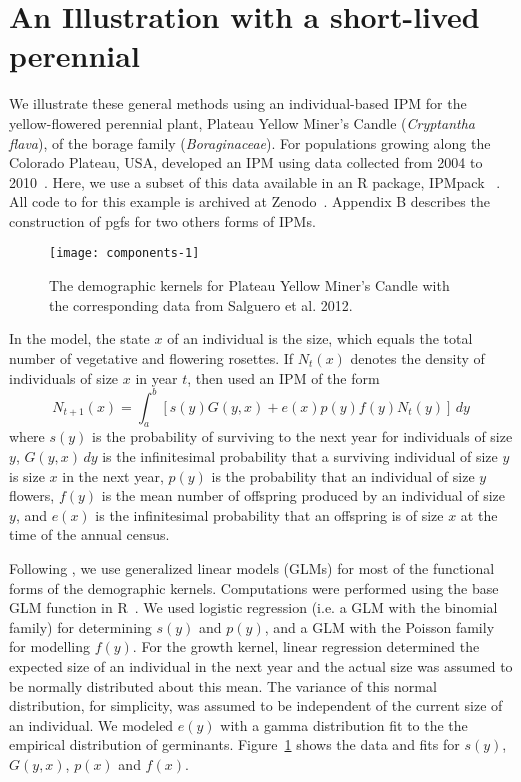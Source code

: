 \documentclass[12pt]{amsart}\usepackage[]{graphicx}\usepackage[]{color}
\makeatletter
\def\maxwidth{ %
  \ifdim\Gin@nat@width>\linewidth
    \linewidth
  \else
    \Gin@nat@width
  \fi
}
\newenvironment{knitrout}{}{} %
\makeatother
\begin{document}
\section*{An Illustration with a short-lived perennial}

We illustrate these general methods using an individual-based IPM for the yellow-flowered perennial plant, Plateau Yellow Miner's Candle (\emph{Cryptantha flava}), of the borage family (\emph{Boraginaceae}). For populations growing along the Colorado Plateau, USA, \citet{salguero-etal-12} developed an IPM using data collected from 2004 to 2010~\citep{salguero-gomez-etal-14}. Here, we use a subset of this data available in an R package, IPMpack ~\citep{IPMpack}.  All code to for this example is archived at Zenodo~\citep{schreiber-ross-ibipm-code-2015}. Appendix B describes the construction of pgfs for two others forms of IPMs. 

\begin{knitrout}
\color{fgcolor}\begin{figure}
\texttt{[image: components-1]} \caption[The demographic kernels for Plateau Yellow Miner's Candle with the corresponding data from Salguero et al]{The demographic kernels for Plateau Yellow Miner's Candle with the corresponding data from Salguero et al. 2012.}\label{fig:components}
\end{figure}


\end{knitrout}

In the model, the state $x$ of an individual is the size, which equals the total number of vegetative and flowering rosettes. If $N_t(x)$ denotes the density of individuals of size $x$ in year $t$, then \citet{salguero-etal-12} used an IPM of the form
\[
N_{t+1}(x)=\int_a^b \left[ s(y)G(y, x)+e(x)p(y)f(y)N_t(y)\right]\, dy
\]
where $s(y)$ is the probability of surviving to the next year for individuals of size $y$, $G(y, x) \, dy$ is the infinitesimal probability that a surviving individual of size $y$ is size $x$ in the next year, $p(y)$ is the probability that an individual of size $y$ flowers, $f(y)$ is the mean number of offspring produced by an individual of size $y$, and $e(x)$ is the infinitesimal probability that an offspring is of size $x$ at the time of the annual census.

Following \citet{salguero-etal-12}, we use generalized linear models (GLMs) for most of the functional forms of the demographic kernels. Computations were performed using the base GLM function in R~\citep{R-15}. We used logistic regression (i.e. a GLM with the binomial family) for determining $s(y)$ and $p(y)$, and a GLM with the Poisson family for modelling $f(y)$.  For the growth kernel, linear regression determined the expected size of an individual in the next year and the actual size was assumed to be normally distributed about this mean. The variance of this normal distribution, for simplicity, was assumed to be independent of the current size of an individual. We modeled $e(y)$ with a gamma distribution fit to the the empirical distribution of germinants. Figure~\ref{fig:components} shows the data and fits for $s(y)$, $G(y, x)$, $p(x)$ and $f(x)$.
\end{document}
